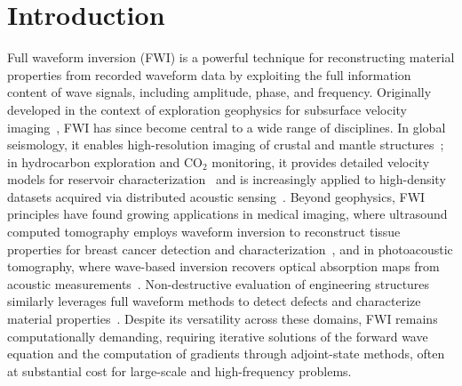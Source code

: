 \documentclass[11pt,a4paper]{article}
\begin{document}
\linenumbers


\section{Introduction}

Full waveform inversion (FWI) is a powerful technique for reconstructing material properties from recorded waveform data by exploiting the full information content of wave signals, including amplitude, phase, and frequency. Originally developed in the context of exploration geophysics for subsurface velocity imaging~\citep{Tarantola1984}, FWI has since become central to a wide range of disciplines. In global seismology, it enables high-resolution imaging of crustal and mantle structures~\citep{Fichtner2009, Ebru2011}; in hydrocarbon exploration and CO$_2$ monitoring, it provides detailed velocity models for reservoir characterization~\citep{Virieux2009} and is increasingly applied to high-density datasets acquired via distributed acoustic sensing~\citep{Zhan2020}. Beyond geophysics, FWI principles have found growing applications in medical imaging, where ultrasound computed tomography employs waveform inversion to reconstruct tissue properties for breast cancer detection and characterization~\citep{10.1121/1.3699240, Sandhu_2015}, and in photoacoustic tomography, where wave-based inversion recovers optical absorption maps from acoustic measurements~\citep{Wang2016}. Non-destructive evaluation of engineering structures similarly leverages full waveform methods to detect defects and characterize material properties~\citep{7422116}. Despite its versatility across these domains, FWI remains computationally demanding, requiring iterative solutions of the forward wave equation and the computation of gradients through adjoint-state methods, often at substantial cost for large-scale and high-frequency problems.
\end{document}
